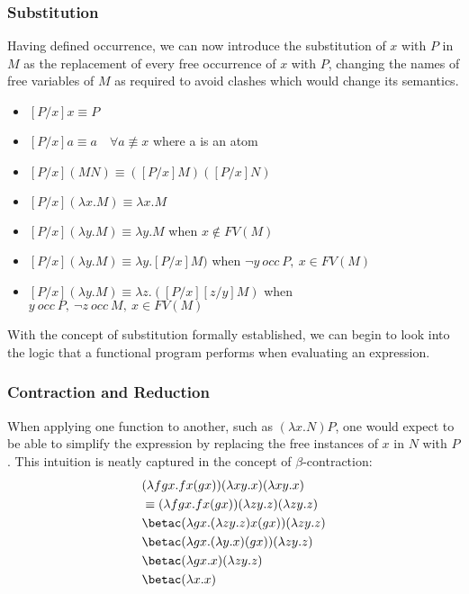
\subsubsection{Substitution}
Having defined occurrence, we can now introduce the substitution of $x$ with $P$ in $M$ as the replacement of every free occurrence of $x$ with $P$, changing the names of free variables of $M$ as required to avoid clashes which would change its semantics\cite{LambdaAndCombinatorsIntro}.
\begin{itemize}
    \item $[P/x]x \equiv P$
    \item $[P/x]a \equiv a\quad\forall a\not\equiv x$ where a is an atom
    \item $[P/x](MN) \equiv ([P/x]M)([P/x]N)$
    \item $[P/x](\lambda x.M) \equiv \lambda x.M$
    \item $[P/x](\lambda y.M) \equiv \lambda y.M$ when $x\notin FV(M)$
    \item $[P/x](\lambda y.M) \equiv \lambda y.[P/x]M)$ when $\neg y\ occ\ P,\ x\in FV(M)$
    \item $[P/x](\lambda y.M) \equiv \lambda z.([P/x][z/y]M)$ when $y\ occ\ P,\ \neg z\ occ\ M,\ x\in FV(M)$
\end{itemize}
With the concept of substitution formally established, we can begin to look into the logic that a functional program performs when evaluating an expression.

\subsubsection{Contraction and Reduction }
When applying  one function to another, such as $(\lambda x.N)P$, one would expect to be able to simplify the expression by replacing the free instances of $x$ in $N$ with $P$. This intuition is neatly captured in the concept of $\beta$-contraction:
\begin{align}
    &(\lambda fgx.fx(gx))(\lambda xy.x)(\lambda xy.x)\\
    &\equiv(\lambda fgx.fx(gx))(\lambda zy.z)(\lambda zy.z)\\
    &\betac (\lambda gx.(\lambda zy.z)x(gx))(\lambda zy.z)\\
    &\betac (\lambda gx.(\lambda y.x)(gx))(\lambda zy.z)\\
    &\betac (\lambda gx.x)(\lambda zy.z)\\
    &\betac (\lambda x.x)
\end{align}

